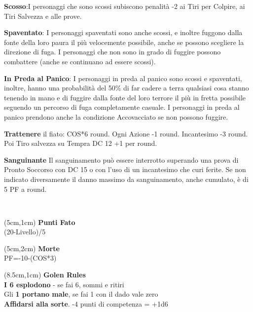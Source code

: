 \documentclass[a4paper,12 pt,openany]{book}
\begin{document}
\begin{textblock*}{19 cm}
\begin{multicols}{2}
			\textbf{Scosso}:I personaggi che sono scossi subiscono penalità -2 ai Tiri per Colpire, ai Tiri Salvezza e alle prove.
			
			\textbf{Spaventato}: I personaggi spaventati sono anche scossi, e inoltre fuggono dalla fonte della loro paura il più velocemente possibile, anche se possono scegliere la direzione di fuga.
			I personaggi che non sono in grado di fuggire possono combattere (anche se continuano ad essere scossi).
			
			\textbf{In Preda al Panico}: I personaggi in preda al panico sono scossi e spaventati, inoltre, hanno una probabilità del 50\% di far cadere a terra qualsiasi cosa stanno tenendo in mano e di fuggire dalla fonte del loro terrore il più in fretta possibile seguendo un percorso di fuga completamente casuale.
			I personaggi in preda al panico prendono anche la condizione Accovacciato se non possono fuggire.
			
			\textbf{Trattenere} il fiato: COS*6 round. Ogni Azione -1 round. Incantesimo -3 round. Poi Tiro salvezza su Tempra DC 12 +1 per round.
			
			\textbf{Sanguinante} Il sanguinamento può essere interrotto superando una prova di Pronto Soccorso con DC 15 o con l'uso di un incantesimo che curi ferite.
			Se non indicato diversamente il danno massimo da sanguinamento, anche cumulato, è di 5 PF a round.
			
		\end{multicols}
		
	\end{textblock*}
	
	~\newpage
	
	\begin{textblock*}{3.5cm}(5cm,1cm) %
		{\textbf{Punti Fato}\\
			\footnotesize 
			(20-Livello)/5}
	\end{textblock*}	
	
	\begin{textblock*}{3.5cm}(5cm,2cm) %
		{\textbf{Morte}\\
			\footnotesize 
			PF=-10-(COS*3)}
	\end{textblock*}	
	
	\begin{textblock*}{11.5cm}(8.5cm,1cm) %
		\textbf{Golen Rules}\\
		
		{\textbf{I 6 esplodono}} - se fai 6, sommi e ritiri\\
		Gli \textbf{1 portano male}, se fai 1 con il dado vale zero\\
		\textbf{Affidarsi alla sorte}. -4 punti di competenza = +1d6\\
	\end{textblock*}	
	
\end{document}
